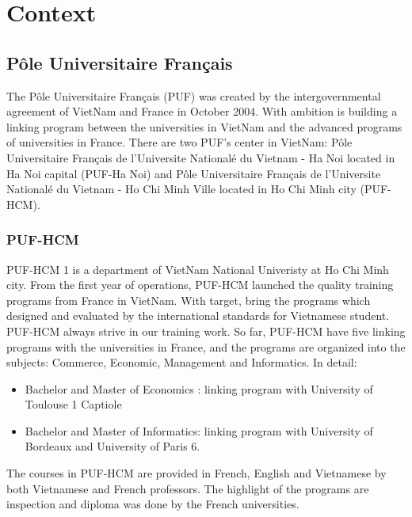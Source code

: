 \documentclass[hidelinks,12pt,a4paper]{report}
\begin{document}
\chapter{Context}
\section{Pôle Universitaire Français}
The Pôle Universitaire Français (PUF) was created by the intergovernmental agreement of VietNam and France in October 2004. With ambition is building a linking program between the universities in VietNam and the advanced programs of universities in France. There are two PUF’s center in VietNam: Pôle Universitaire Français de l’Universite Nationalé du Vietnam - Ha Noi located in Ha Noi capital (PUF-Ha Noi) and Pôle Universitaire Français de l’Universite Nationalé du Vietnam - Ho Chi Minh Ville located in Ho Chi Minh city (PUF-HCM).
\subsection{PUF-HCM}
PUF-HCM 1 is a department of VietNam National Univeristy at Ho Chi Minh city. From the first year of operations, PUF-HCM launched the quality training programs from France in VietNam. With target, bring the programs which designed and evaluated by the international standards for Vietnamese student. PUF-HCM always strive in our training work. So far, PUF-HCM have five linking programs with the universities in France, and the programs are organized into the subjects: Commerce, Economic, Management and Informatics. In detail:

\begin{itemize}
	\item Bachelor and Master of Economics : linking program with University of Toulouse 1 Captiole
	\item Bachelor and Master of Informatics: linking program with University of Bordeaux and University of Paris 6.
\end{itemize}
The courses in PUF-HCM are provided in French, English and Vietnamese by both Vietnamese and French professors. The highlight of the programs are inspection and diploma was done by the French universities.
\end{document}
